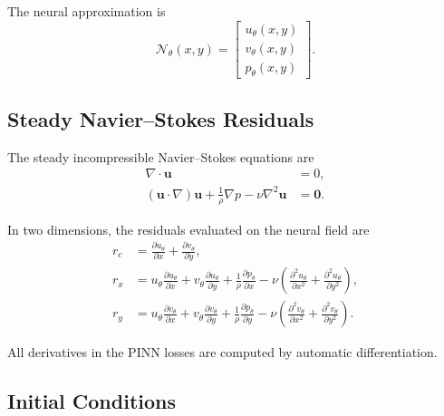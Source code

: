 \documentclass[11pt]{article}
\begin{document}
The neural approximation is
\begin{equation}
    \mathcal{N}_{\theta}(x,y)
    =
    \begin{bmatrix}
        u_{\theta}(x,y)\\
        v_{\theta}(x,y)\\
        p_{\theta}(x,y)
    \end{bmatrix}.
\end{equation}

\subsection{Steady Navier--Stokes Residuals}

The steady incompressible Navier--Stokes equations are
\begin{align}
    \nabla\cdot \bm{u} &= 0,\\
    (\bm{u}\cdot\nabla)\bm{u}
    + \frac{1}{\rho}\nabla p
    - \nu \nabla^2 \bm{u}
    &= \bm{0}.
\end{align}

In two dimensions, the residuals evaluated on the neural field are
\begin{align}
    r_c
    &=
    \frac{\partial u_{\theta}}{\partial x}
    +
    \frac{\partial v_{\theta}}{\partial y},
    \label{eq:common_continuity}\\
    r_x
    &=
    u_{\theta}\frac{\partial u_{\theta}}{\partial x}
    +
    v_{\theta}\frac{\partial u_{\theta}}{\partial y}
    +
    \frac{1}{\rho}\frac{\partial p_{\theta}}{\partial x}
    -
    \nu
    \left(
        \frac{\partial^2 u_{\theta}}{\partial x^2}
        +
        \frac{\partial^2 u_{\theta}}{\partial y^2}
    \right),
    \label{eq:common_momentum_x}\\
    r_y
    &=
    u_{\theta}\frac{\partial v_{\theta}}{\partial x}
    +
    v_{\theta}\frac{\partial v_{\theta}}{\partial y}
    +
    \frac{1}{\rho}\frac{\partial p_{\theta}}{\partial y}
    -
    \nu
    \left(
        \frac{\partial^2 v_{\theta}}{\partial x^2}
        +
        \frac{\partial^2 v_{\theta}}{\partial y^2}
    \right).
    \label{eq:common_momentum_y}
\end{align}

All derivatives in the PINN losses are computed by automatic differentiation.

\subsection{Initial Conditions}
\end{document}
